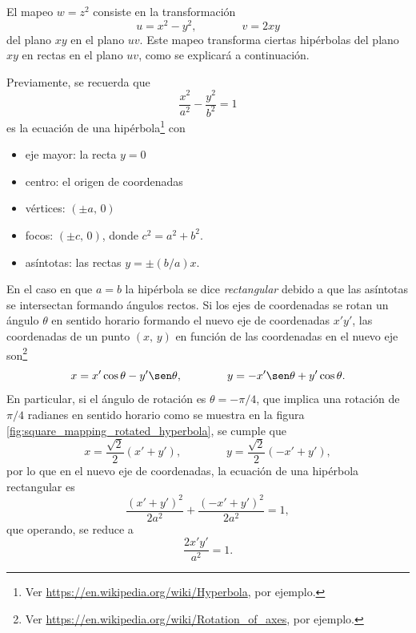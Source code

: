 \documentclass[a4paper]{report}
\begin{document}
El mapeo \(w=z^2\) consiste en la transformación
\begin{equation}\label{eq:square_mapping}
  u=x^2-y^2,\qquad\qquad v=2xy
\end{equation}
del plano \(xy\) en el plano \(uv\). Este mapeo transforma ciertas hipérbolas del plano \(xy\) en rectas en el plano \(uv\), como se explicará a continuación.

Previamente, se recuerda que 
\begin{equation}\label{eq:hyperbola_canonical_equation}
 \frac{x^2}{a^2}-\frac{y^2}{b^2}=1 
\end{equation}
es la ecuación de una hipérbola\footnote{Ver \url{https://en.wikipedia.org/wiki/Hyperbola}, por ejemplo.} con 
\begin{itemize}
 \item eje mayor: la recta \(y=0\)
 \item centro: el origen de coordenadas
 \item vértices: \((\pm a,\,0)\)
 \item focos: \((\pm c,\,0)\), donde \(c^2=a^2+b^2\).
 \item asíntotas: las rectas \(y=\pm (b/a)x\).
\end{itemize}
En el caso en que \(a=b\) la hipérbola se dice \emph{rectangular} debido a que las asíntotas se intersectan formando ángulos rectos. Si los ejes de coordenadas se rotan un ángulo \(\theta\) en sentido horario formando el nuevo eje de coordenadas \(x'y'\), las coordenadas de un punto \((x,\,y)\) en función de las coordenadas en el nuevo eje son\footnote{Ver \url{https://en.wikipedia.org/wiki/Rotation_of_axes}, por ejemplo.}
\[
  x=x'\cos\theta-y'\sen\theta,\qquad\qquad
  y=-x'\sen\theta+y'\cos\theta.
\]
En particular, si el ángulo de rotación es \(\theta=-\pi/4\), que implica una rotación de \(\pi/4\) radianes en sentido horario como se muestra en la figura \ref{fig:square_mapping_rotated_hyperbola}, se cumple que
\[
 x=\frac{\sqrt{2}}{2}\left(x'+y'\right),\qquad\qquad
 y=\frac{\sqrt{2}}{2}\left(-x'+y'\right),
\]
por lo que en el nuevo eje de coordenadas, la ecuación de una hipérbola rectangular es
\[
 \frac{(x'+y')^2}{2a^2}+\frac{(-x'+y')^2}{2a^2}=1,
\]
que operando, se reduce a 
\begin{equation}\label{eq:rectangular_hyperbola_1st_3rd_quadrant_equation}
 \frac{2x'y'}{a^2}=1.
\end{equation}
\end{document}
